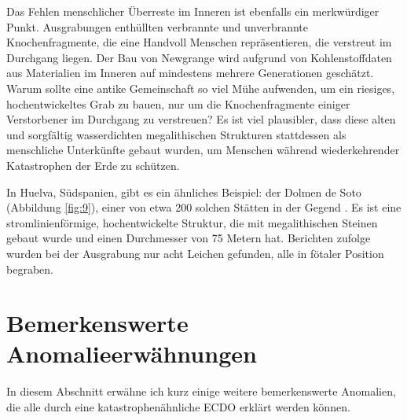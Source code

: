 \documentclass[10pt,twocolumn,letterpaper]{article}
\begin{document}
Das Fehlen menschlicher Überreste im Inneren ist ebenfalls ein merkwürdiger Punkt. Ausgrabungen enthüllten verbrannte und unverbrannte Knochenfragmente, die eine Handvoll Menschen repräsentieren, die verstreut im Durchgang liegen. Der Bau von Newgrange wird aufgrund von Kohlenstoffdaten aus Materialien im Inneren auf mindestens mehrere Generationen geschätzt. Warum sollte eine antike Gemeinschaft so viel Mühe aufwenden, um ein riesiges, hochentwickeltes Grab zu bauen, nur um die Knochenfragmente einiger Verstorbener im Durchgang zu verstreuen? Es ist viel plausibler, dass diese alten und sorgfältig wasserdichten megalithischen Strukturen stattdessen als menschliche Unterkünfte gebaut wurden, um Menschen während wiederkehrender Katastrophen der Erde zu schützen.

In Huelva, Südspanien, gibt es ein ähnliches Beispiel: der Dolmen de Soto (Abbildung \ref{fig:9}), einer von etwa 200 solchen Stätten in der Gegend \cite{72,32}. Es ist eine stromlinienförmige, hochentwickelte Struktur, die mit megalithischen Steinen gebaut wurde und einen Durchmesser von 75 Metern hat. Berichten zufolge wurden bei der Ausgrabung nur acht Leichen gefunden, alle in fötaler Position begraben.

\section{Bemerkenswerte Anomalieerwähnungen}

In diesem Abschnitt erwähne ich kurz einige weitere bemerkenswerte Anomalien, die alle durch eine katastrophenähnliche ECDO erklärt werden können.
\end{document}
